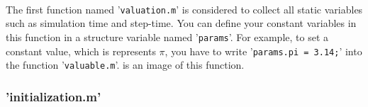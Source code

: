{{{			\paragraph{} {
				The first function named '\texttt{valuation.m}' is considered to collect all static variables such as simulation time and step-time.
				You can define your constant variables in this function in a structure variable named '\texttt{params}'.
				For example, to set a constant value, which is represents $\pi$, you have to write '\texttt{params.pi = 3.14;}' into the function '\texttt{valuable.m}'.
				 is an image of this function.
			}
			\begin{figure}[tbp]
			\end{figure}
		}

		\subsubsection{'initialization.m'} {
}}}

